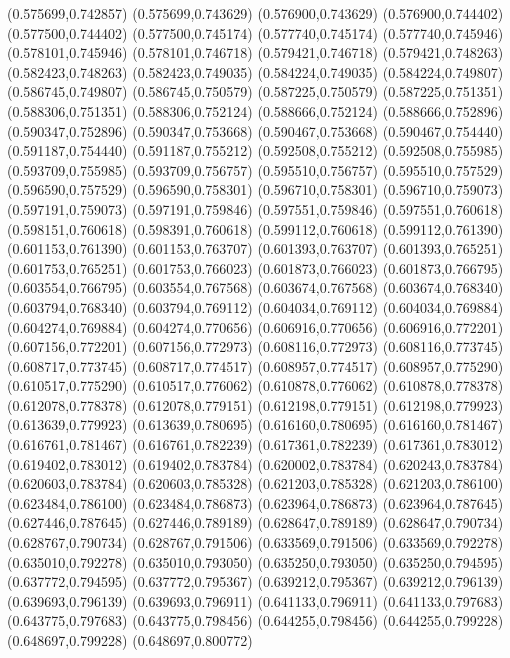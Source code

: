 (0.575699,0.742857)
(0.575699,0.743629)
(0.576900,0.743629)
(0.576900,0.744402)
(0.577500,0.744402)
(0.577500,0.745174)
(0.577740,0.745174)
(0.577740,0.745946)
(0.578101,0.745946)
(0.578101,0.746718)
(0.579421,0.746718)
(0.579421,0.748263)
(0.582423,0.748263)
(0.582423,0.749035)
(0.584224,0.749035)
(0.584224,0.749807)
(0.586745,0.749807)
(0.586745,0.750579)
(0.587225,0.750579)
(0.587225,0.751351)
(0.588306,0.751351)
(0.588306,0.752124)
(0.588666,0.752124)
(0.588666,0.752896)
(0.590347,0.752896)
(0.590347,0.753668)
(0.590467,0.753668)
(0.590467,0.754440)
(0.591187,0.754440)
(0.591187,0.755212)
(0.592508,0.755212)
(0.592508,0.755985)
(0.593709,0.755985)
(0.593709,0.756757)
(0.595510,0.756757)
(0.595510,0.757529)
(0.596590,0.757529)
(0.596590,0.758301)
(0.596710,0.758301)
(0.596710,0.759073)
(0.597191,0.759073)
(0.597191,0.759846)
(0.597551,0.759846)
(0.597551,0.760618)
(0.598151,0.760618)
(0.598391,0.760618)
(0.599112,0.760618)
(0.599112,0.761390)
(0.601153,0.761390)
(0.601153,0.763707)
(0.601393,0.763707)
(0.601393,0.765251)
(0.601753,0.765251)
(0.601753,0.766023)
(0.601873,0.766023)
(0.601873,0.766795)
(0.603554,0.766795)
(0.603554,0.767568)
(0.603674,0.767568)
(0.603674,0.768340)
(0.603794,0.768340)
(0.603794,0.769112)
(0.604034,0.769112)
(0.604034,0.769884)
(0.604274,0.769884)
(0.604274,0.770656)
(0.606916,0.770656)
(0.606916,0.772201)
(0.607156,0.772201)
(0.607156,0.772973)
(0.608116,0.772973)
(0.608116,0.773745)
(0.608717,0.773745)
(0.608717,0.774517)
(0.608957,0.774517)
(0.608957,0.775290)
(0.610517,0.775290)
(0.610517,0.776062)
(0.610878,0.776062)
(0.610878,0.778378)
(0.612078,0.778378)
(0.612078,0.779151)
(0.612198,0.779151)
(0.612198,0.779923)
(0.613639,0.779923)
(0.613639,0.780695)
(0.616160,0.780695)
(0.616160,0.781467)
(0.616761,0.781467)
(0.616761,0.782239)
(0.617361,0.782239)
(0.617361,0.783012)
(0.619402,0.783012)
(0.619402,0.783784)
(0.620002,0.783784)
(0.620243,0.783784)
(0.620603,0.783784)
(0.620603,0.785328)
(0.621203,0.785328)
(0.621203,0.786100)
(0.623484,0.786100)
(0.623484,0.786873)
(0.623964,0.786873)
(0.623964,0.787645)
(0.627446,0.787645)
(0.627446,0.789189)
(0.628647,0.789189)
(0.628647,0.790734)
(0.628767,0.790734)
(0.628767,0.791506)
(0.633569,0.791506)
(0.633569,0.792278)
(0.635010,0.792278)
(0.635010,0.793050)
(0.635250,0.793050)
(0.635250,0.794595)
(0.637772,0.794595)
(0.637772,0.795367)
(0.639212,0.795367)
(0.639212,0.796139)
(0.639693,0.796139)
(0.639693,0.796911)
(0.641133,0.796911)
(0.641133,0.797683)
(0.643775,0.797683)
(0.643775,0.798456)
(0.644255,0.798456)
(0.644255,0.799228)
(0.648697,0.799228)
(0.648697,0.800772)
